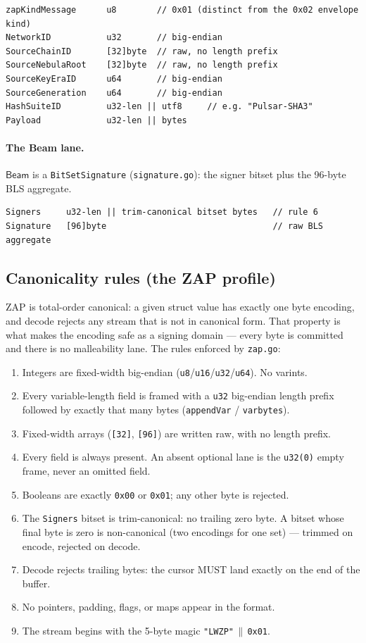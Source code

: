 \begin{verbatim}
zapKindMessage      u8        // 0x01 (distinct from the 0x02 envelope kind)
NetworkID           u32       // big-endian
SourceChainID       [32]byte  // raw, no length prefix
SourceNebulaRoot    [32]byte  // raw, no length prefix
SourceKeyEraID      u64       // big-endian
SourceGeneration    u64       // big-endian
HashSuiteID         u32-len || utf8     // e.g. "Pulsar-SHA3"
Payload             u32-len || bytes
\end{verbatim}

\paragraph{The Beam lane.} $\mathsf{Beam}$ is a \texttt{BitSetSignature} (\texttt{signature.go}): the signer bitset plus the 96-byte BLS aggregate.

\begin{verbatim}
Signers     u32-len || trim-canonical bitset bytes   // rule 6
Signature   [96]byte                                 // raw BLS aggregate
\end{verbatim}

\subsection{Canonicality rules (the ZAP profile)}

ZAP is total-order canonical: a given struct value has exactly one byte encoding, and decode rejects any stream that is not in canonical form. That property is what makes the encoding safe as a signing domain --- every byte is committed and there is no malleability lane. The rules enforced by \texttt{zap.go}:

\begin{enumerate}[leftmargin=2em,nosep]
  \item Integers are fixed-width big-endian (\texttt{u8}/\texttt{u16}/\texttt{u32}/\texttt{u64}). No varints.
  \item Every variable-length field is framed with a \texttt{u32} big-endian length prefix followed by exactly that many bytes (\texttt{appendVar} / \texttt{varbytes}).
  \item Fixed-width arrays (\texttt{[32]}, \texttt{[96]}) are written raw, with no length prefix.
  \item Every field is always present. An absent optional lane is the \texttt{u32(0)} empty frame, never an omitted field.
  \item Booleans are exactly \texttt{0x00} or \texttt{0x01}; any other byte is rejected.
  \item The \texttt{Signers} bitset is trim-canonical: no trailing zero byte. A bitset whose final byte is zero is non-canonical (two encodings for one set) --- trimmed on encode, rejected on decode.
  \item Decode rejects trailing bytes: the cursor MUST land exactly on the end of the buffer.
  \item No pointers, padding, flags, or maps appear in the format.
  \item The stream begins with the 5-byte magic \texttt{"LWZP"}$\,\|\,$\texttt{0x01}.
\end{enumerate}

